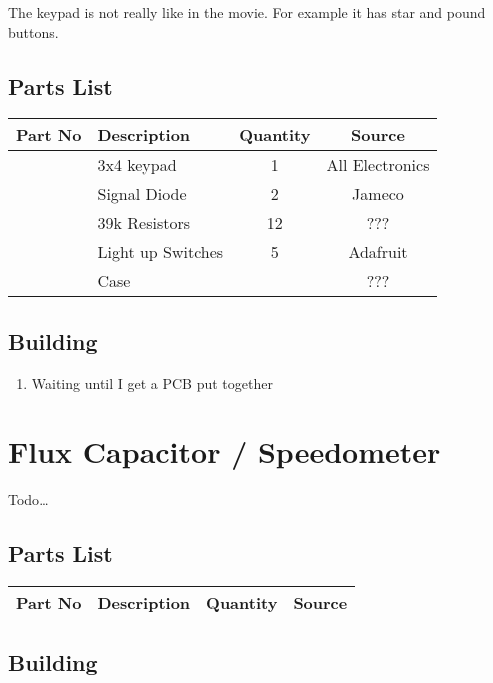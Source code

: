 \documentclass[11pt]{article}
\begin{document}
The keypad is not really like in the movie.  For example
it has star and pound buttons.


\subsection{Parts List}

\begin{tabular}{|c|l|c|c|}
\hline
Part No	&  Description			&  Quantity	& Source \\
\hline
\hline
	& 3x4 keypad		& 1		& All Electronics \\
\hline
	& Signal Diode		& 2		& Jameco \\
\hline
	& 39k Resistors		& 12		& ??? \\

\hline
	& Light up Switches 	& 5		& Adafruit \\
\hline
	& Case			&		& ??? \\
\hline
\end{tabular}

\subsection{Building}

\begin{enumerate}
\item Waiting until I get a PCB put together
\end{enumerate}

\pagebreak
\section{Flux Capacitor / Speedometer}

Todo{\dots}

\subsection{Parts List}

\begin{tabular}{|c|l|c|c|}
\hline
Part No	&  Description			&  Quantity	& Source \\
\hline
\hline
\end{tabular}

\subsection{Building}
\end{document}
